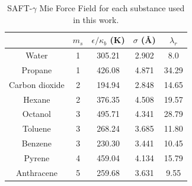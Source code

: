 \begin{table}[h]
\centering
  \caption{SAFT-$\gamma$ Mie Force Field for each substance used in this work.}
  \label{tbl:parameters}
  \begin{tabular}{ccccc}
      \hline
      \hline
                     & $m_s$ & $\epsilon/\kappa_{b}$ (K) & $\sigma$ (\AA) & $\lambda_r$ \\ \hline\hline
      Water          & 1     & 305.21               & 2.902              & 8.0         \\
      Propane        & 1     & 426.08               & 4.871              & 34.29       \\
      Carbon dioxide & 2     & 194.94               & 2.848              & 14.65       \\
      Hexane         & 2     & 376.35               & 4.508              & 19.57       \\
      Octanol        & 3     & 495.71               & 4.341              & 28.79       \\
      Toluene        & 3     & 268.24               & 3.685              & 11.80       \\
      Benzene        & 3     & 230.30               & 3.441              & 10.45       \\
      Pyrene         & 4     & 459.04               & 4.134              & 15.79       \\
      Anthracene     & 5     & 259.68               & 3.631              & 9.55        \\ 
      \hline
      \hline
  \end{tabular}

\end{table}
\FloatBarrier
